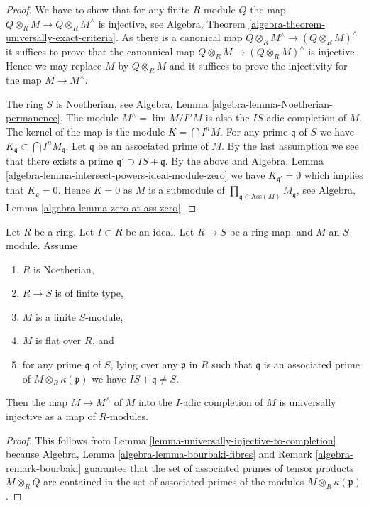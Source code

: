\begin{proof}
We have to show that for any finite $R$-module $Q$ the map
$Q \otimes_R M \to Q \otimes_R M^\wedge$ is injective, see
Algebra, Theorem \ref{algebra-theorem-universally-exact-criteria}.
As there is a canonical map $Q \otimes_R M^\wedge \to (Q \otimes_R M)^\wedge$
it suffices to prove that the canonnical map
$Q \otimes_R M \to (Q \otimes_R M)^\wedge$ is injective.
Hence we may replace $M$ by $Q \otimes_R M$ and it suffices to prove the
injectivity for the map $M \to M^\wedge$.

\medskip\noindent
The ring $S$ is Noetherian, see
Algebra, Lemma \ref{algebra-lemma-Noetherian-permanence}.
The module $M^\wedge = \lim M/I^nM$ is also the $IS$-adic completion of $M$.
The kernel of the map is the module $K = \bigcap I^nM$.
For any prime $\mathfrak q$ of $S$ we have
$K_{\mathfrak q} \subset \bigcap I^nM_{\mathfrak q}$.
Let $\mathfrak q$ be an associated prime of $M$.
By the last assumption we see that there exists a prime
$\mathfrak q' \supset IS + \mathfrak q$. By the above and
Algebra, Lemma \ref{algebra-lemma-intersect-powers-ideal-module-zero}
we have $K_{\mathfrak q'} = 0$ which implies that $K_{\mathfrak q} = 0$.
Hence $K = 0$ as $M$ is a submodule of
$\prod_{\mathfrak q \in \text{Ass}(M)} M_{\mathfrak q}$, see
Algebra, Lemma \ref{algebra-lemma-zero-at-ass-zero}.
\end{proof}

\begin{lemma}
\label{lemma-universally-injective-to-completion-flat}
Let $R$ be a ring.
Let $I \subset R$ be an ideal.
Let $R \to S$ be a ring map, and $M$ an $S$-module.
Assume
\begin{enumerate}
\item $R$ is Noetherian,
\item $R \to S$ is of finite type,
\item $M$ is a finite $S$-module,
\item $M$ is flat over $R$, and
\item for any prime $\mathfrak q$ of $S$, lying over any $\mathfrak p$ in $R$
such that $\mathfrak q$ is an associated prime of
$M \otimes_R \kappa(\mathfrak p)$ we have $IS + \mathfrak q \not = S$.
\end{enumerate}
Then the map $M \to M^\wedge$ of $M$ into the $I$-adic completion of $M$
is universally injective as a map of $R$-modules.
\end{lemma}

\begin{proof}
This follows from
Lemma \ref{lemma-universally-injective-to-completion}
because
Algebra, Lemma \ref{algebra-lemma-bourbaki-fibres}
and
Remark \ref{algebra-remark-bourbaki}
guarantee that the set of associated primes of tensor products
$M \otimes_R Q$ are contained in the set of associated primes of
the modules $M \otimes_R \kappa(\mathfrak p)$.
\end{proof}




